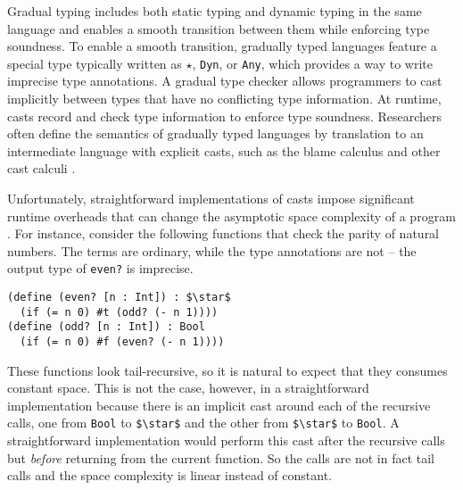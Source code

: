 \documentclass[runningheads]{llncs}
\newcommand{\Tdyn}[0]{\ensuremath{\star}}
\begin{document}
Gradual typing \citep{siek2006gradual,siek2015refined} includes both static typing 
and dynamic typing in the same language and enables a smooth transition between them while
enforcing type soundness.
To enable a smooth transition, gradually typed languages feature a special type
typically written as \Tdyn{}, \lstinline|Dyn|, or \lstinline|Any|, which
provides a way to write imprecise type annotations. A gradual type checker allows programmers to cast 
implicitly between types that have no conflicting type information.
At runtime, casts record and check type information to enforce type soundness.
Researchers often define the semantics of gradually typed languages by
translation to an intermediate language with explicit casts, such as the blame
calculus \citep{wadler2009well} and other cast calculi \citep{siek2009exploring}.


Unfortunately, straightforward implementations of casts impose significant 
runtime overheads that can change the asymptotic space complexity of a program 
\citep{herman2010space}.
For instance, consider the following functions 
that check the parity of natural numbers. The terms are ordinary, while the 
type annotations are not -- the output type of \lstinline|even?| is 
imprecise.
\begin{lstlisting}
(define (even? [n : Int]) : $\star$
  (if (= n 0) #t (odd? (- n 1))))
(define (odd? [n : Int]) : Bool
  (if (= n 0) #f (even? (- n 1))))
\end{lstlisting}
These functions look tail-recursive, so it is natural to expect that
they consumes constant space. This is not the case, however, in a
straightforward implementation because there is an implicit cast
around each of the recursive calls, one from \lstinline|Bool| to
\lstinline|$\star$| and the other from \lstinline|$\star$| to
\lstinline|Bool|.  A straightforward implementation would perform this
cast after the recursive calls but \textit{before} returning from the
current function. So the calls are not in fact tail calls and the
space complexity is linear instead of constant.
\end{document}
